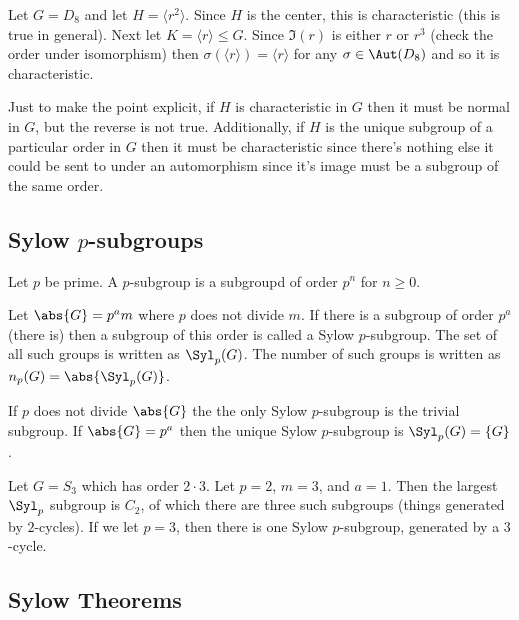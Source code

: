 \begin{example}
Let $G = D_8$ and let $H = \langle r^2 \rangle$. Since $H$ is the center, this is characteristic (this is true in general). Next let $K = \langle r \rangle \leq G$. Since $\Im(r)$ is either $r$ or $r^3$ (check the order under isomorphism) then $\sigma(\langle r \rangle) = \langle r \rangle$ for any $\sigma \in \Aut(D_8)$ and so it is characteristic.
\end{example}

Just to make the point explicit, if $H$ is characteristic in $G$ then it must be normal in $G$, but the reverse is not true. Additionally, if $H$ is the unique subgroup of a particular order in $G$ then it must be characteristic since there's nothing else it could be sent to under an automorphism since it's image must be a subgroup of the same order.

\subsection{Sylow \texorpdfstring{$p$}{p}-subgroups}

\begin{definition}
Let $p$ be prime. A $p$-subgroup is a subgroupd of order $p^n$ for $n \geq 0$.
\end{definition}

\begin{definition}
Let $\abs{G} = p^am$ where $p$ does not divide $m$. If there is a subgroup of order $p^a$ (there is) then a subgroup of this order is called a Sylow $p$-subgroup. The set of all such groups is written as $\Syl_p(G)$. The number of such groups is written as $n_p(G) = \abs{\Syl_p(G)}$.
\end{definition}

\begin{example}
If $p$ does not divide $\abs{G}$ the the only Sylow $p$-subgroup is the trivial subgroup. If $\abs{G} = p^a$ then the unique Sylow $p$-subgroup is $\Syl_p(G) = \{G\}$.
\end{example}

\begin{example}
Let $G = S_3$ which has order $2 \cdot 3$. Let $p = 2$, $m = 3$, and $a = 1$. Then the largest $\Syl_p$ subgroup is $C_2$, of which there are three such subgroups (things generated by $2$-cycles). If we let $p = 3$, then there is one Sylow $p$-subgroup, generated by a $3$-cycle.
\end{example}

\subsection{Sylow Theorems}

